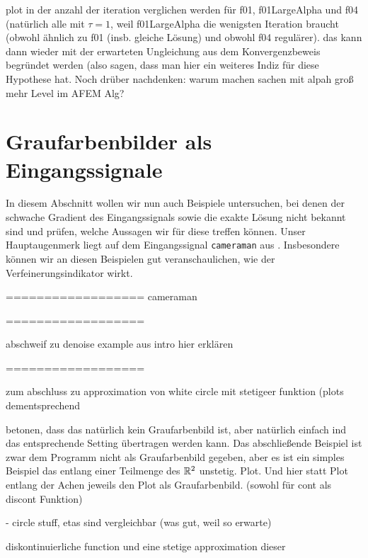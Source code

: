 plot in der anzahl der iteration verglichen werden für f01,
f01LargeAlpha und f04 (natürlich alle mit $\tau=1$, weil  f01LargeAlpha die
wenigsten Iteration braucht (obwohl ähnlich
zu f01 (insb. gleiche Lösung) und obwohl f04 regulärer). 
das kann dann wieder
mit der erwarteten Ungleichung aus dem Konvergenzbeweis begründet werden (also
sagen, dass man hier ein weiteres Indiz für diese Hypothese hat.
Noch drüber nachdenken: warum machen sachen mit alpah groß mehr Level im AFEM
Alg?


\section{Graufarbenbilder als Eingangssignale}
\label{sec:grayscalePicturesAsInputSignal}

In diesem Abschnitt wollen wir nun auch Beispiele untersuchen, bei denen
der schwache Gradient des Eingangssignals sowie die exakte Lösung nicht bekannt
sind und prüfen, welche Aussagen wir für diese treffen können.
Unser Hauptaugenmerk liegt auf dem Eingangssignal \texttt{cameraman} aus
. 
Insbesondere können wir an diesen Beispielen gut veranschaulichen, wie
der Verfeinerungsindikator wirkt.

==================
cameraman

==================

abschweif zu denoise example aus intro hier erklären

==================

zum abschluss zu approximation von white circle mit stetigeer funktion (plots
dementsprechend

betonen, dass das natürlich kein Graufarbenbild ist, aber natürlich einfach
ind das entsprechende Setting übertragen werden kann.
Das abschließende Beispiel ist zwar dem Programm nicht als Graufarbenbild 
gegeben, aber es ist ein simples Beispiel das entlang einer Teilmenge des
$\mathbb{R}^2$ unstetig. Plot. Und hier statt Plot entlang der Achen jeweils
den Plot als Graufarbenbild. (sowohl für cont als discont Funktion)

  - circle stuff, etas sind vergleichbar (was gut, weil so erwarte)

diskontinuierliche function und eine stetige approximation dieser

